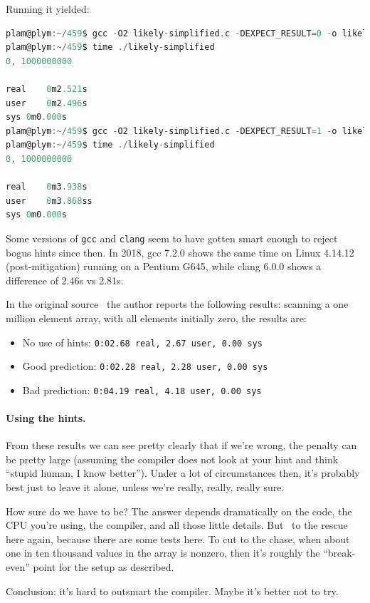 \documentclass[a4paper]{report}
\begin{document}
Running it yielded:
\begin{lstlisting}[language=C]
plam@plym:~/459$ gcc -O2 likely-simplified.c -DEXPECT_RESULT=0 -o likely-simplified
plam@plym:~/459$ time ./likely-simplified
0, 1000000000

real	0m2.521s
user	0m2.496s
sys	0m0.000s
plam@plym:~/459$ gcc -O2 likely-simplified.c -DEXPECT_RESULT=1 -o likely-simplified
plam@plym:~/459$ time ./likely-simplified
0, 1000000000

real	0m3.938s
user	0m3.868ss
sys	0m0.000s
\end{lstlisting}
Some versions of {\tt gcc} and {\tt clang} seem to have gotten smart enough to reject bogus hints since then. In 2018, gcc 7.2.0 shows the same time on Linux 4.14.12 (post-mitigation) running on a Pentium G645, while clang 6.0.0 shows a difference of 2.46s vs 2.81s.

In the original source~\cite{mispredict} the author reports the following results: scanning a one million element array, with all elements initially zero, the results are:
\vspace*{-1em}
\begin{itemize}[noitemsep]
	\item No use of hints: \texttt{0:02.68 real,  2.67 user, 0.00 sys}
	\item Good prediction: \texttt{0:02.28 real,  2.28 user, 0.00 sys}
	\item Bad prediction: \texttt{0:04.19 real,  4.18 user, 0.00 sys}
\end{itemize}

\paragraph{Using the hints.} From these results we can see pretty clearly that if we're wrong, the penalty can be pretty large (assuming the compiler does not look at your hint and think ``stupid human, I know better''). Under a lot of circumstances then, it's probably best just to leave it alone, unless we're really, really, really sure. 

How sure do we have to be? The answer depends dramatically on the code, the CPU you're using, the compiler, and all those little details. But~\cite{mispredict} to the rescue here again, because there are some tests here. To cut to the chase, when about one in ten thousand values in the array is nonzero, then it's roughly the ``break-even'' point for the setup as described.

Conclusion: it's hard to outsmart the compiler. Maybe it's better not to try.
\end{document}
